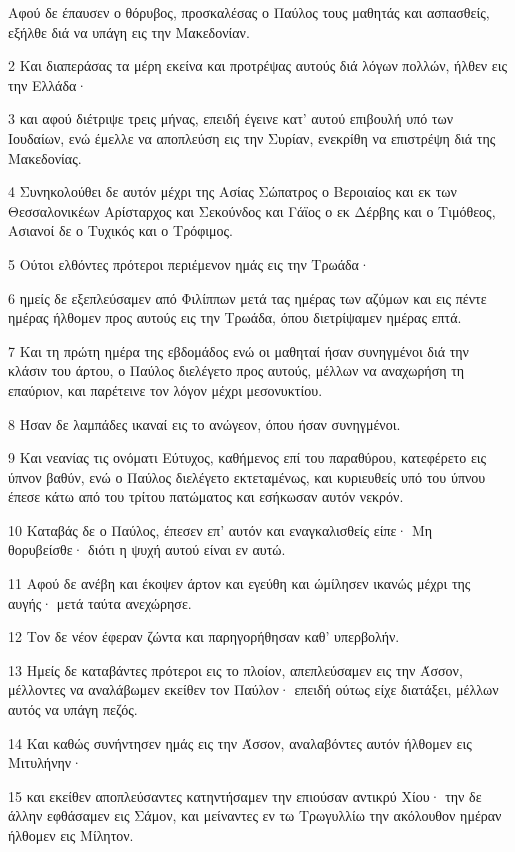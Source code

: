 \par Αφού δε έπαυσεν ο θόρυβος, προσκαλέσας ο Παύλος τους μαθητάς και ασπασθείς, εξήλθε διά να υπάγη εις την Μακεδονίαν.
\par 2 Και διαπεράσας τα μέρη εκείνα και προτρέψας αυτούς διά λόγων πολλών, ήλθεν εις την Ελλάδα·
\par 3 και αφού διέτριψε τρεις μήνας, επειδή έγεινε κατ' αυτού επιβουλή υπό των Ιουδαίων, ενώ έμελλε να αποπλεύση εις την Συρίαν, ενεκρίθη να επιστρέψη διά της Μακεδονίας.
\par 4 Συνηκολούθει δε αυτόν μέχρι της Ασίας Σώπατρος ο Βεροιαίος και εκ των Θεσσαλονικέων Αρίσταρχος και Σεκούνδος και Γάϊος ο εκ Δέρβης και ο Τιμόθεος, Ασιανοί δε ο Τυχικός και ο Τρόφιμος.
\par 5 Ούτοι ελθόντες πρότεροι περιέμενον ημάς εις την Τρωάδα·
\par 6 ημείς δε εξεπλεύσαμεν από Φιλίππων μετά τας ημέρας των αζύμων και εις πέντε ημέρας ήλθομεν προς αυτούς εις την Τρωάδα, όπου διετρίψαμεν ημέρας επτά.
\par 7 Και τη πρώτη ημέρα της εβδομάδος ενώ οι μαθηταί ήσαν συνηγμένοι διά την κλάσιν του άρτου, ο Παύλος διελέγετο προς αυτούς, μέλλων να αναχωρήση τη επαύριον, και παρέτεινε τον λόγον μέχρι μεσονυκτίου.
\par 8 Ήσαν δε λαμπάδες ικαναί εις το ανώγεον, όπου ήσαν συνηγμένοι.
\par 9 Και νεανίας τις ονόματι Εύτυχος, καθήμενος επί του παραθύρου, κατεφέρετο εις ύπνον βαθύν, ενώ ο Παύλος διελέγετο εκτεταμένως, και κυριευθείς υπό του ύπνου έπεσε κάτω από του τρίτου πατώματος και εσήκωσαν αυτόν νεκρόν.
\par 10 Καταβάς δε ο Παύλος, έπεσεν επ' αυτόν και εναγκαλισθείς είπε· Μη θορυβείσθε· διότι η ψυχή αυτού είναι εν αυτώ.
\par 11 Αφού δε ανέβη και έκοψεν άρτον και εγεύθη και ώμίλησεν ικανώς μέχρι της αυγής· μετά ταύτα ανεχώρησε.
\par 12 Τον δε νέον έφεραν ζώντα και παρηγορήθησαν καθ' υπερβολήν.
\par 13 Ημείς δε καταβάντες πρότεροι εις το πλοίον, απεπλεύσαμεν εις την Άσσον, μέλλοντες να αναλάβωμεν εκείθεν τον Παύλον· επειδή ούτως είχε διατάξει, μέλλων αυτός να υπάγη πεζός.
\par 14 Και καθώς συνήντησεν ημάς εις την Άσσον, αναλαβόντες αυτόν ήλθομεν εις Μιτυλήνην·
\par 15 και εκείθεν αποπλεύσαντες κατηντήσαμεν την επιούσαν αντικρύ Χίου· την δε άλλην εφθάσαμεν εις Σάμον, και μείναντες εν τω Τρωγυλλίω την ακόλουθον ημέραν ήλθομεν εις Μίλητον.
